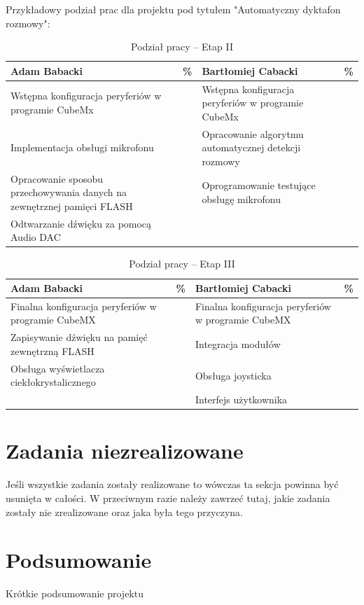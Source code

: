 \documentclass[10pt, a4paper]{article}
\begin{document}
Przykładowy podział prac dla projektu pod tytułem 
"Automatyczny dyktafon rozmowy":

\begin{table}[H]
	\centering
	\begin{tabular}{|L{7cm}|L{0.8cm}||L{7cm}|L{0.8cm}|}
		\hline
		\hline
		\textbf{Adam Babacki} & 
		\% & 
		\textbf{Bartłomiej Cabacki} & \%\\
		\hline
		\hline
		Wstępna konfiguracja peryferiów w programie CubeMx		& &	
		Wstępna konfiguracja peryferiów w programie CubeMx &\\
		\hline
		Implementacja obsługi mikrofonu & &
		Opracowanie algorytmu automatycznej detekcji rozmowy &\\
		\hline
		Opracowanie sposobu przechowywania danych na zewnętrznej pamięci FLASH & &
		Oprogramowanie testujące obsługę mikrofonu & \\
		\hline
		Odtwarzanie dźwięku za pomocą Audio DAC & & &\\
		\hline
	\end{tabular}
	\caption{Podział pracy -- Etap II}
	\label{tab:PodzialPracyEtap2}
\end{table}

\begin{table}[H]
	\centering
	\begin{tabular}{|L{7cm}|L{0.8cm}||L{7cm}|L{0.8cm}|}
		\hline
		\hline
		\textbf{Adam Babacki} & 
		\% & 
		\textbf{Bartłomiej Cabacki} & \%\\
		\hline
		\hline
		Finalna konfiguracja peryferiów w programie CubeMX		& &	
		Finalna konfiguracja peryferiów w programie CubeMX &\\
		\hline
		Zapisywanie dźwięku na pamięć zewnętrzną FLASH  & &
		Integracja modułów &\\
		\hline
		Obsługa wyświetlacza ciekłokrystalicznego & &
		Obsługa joysticka & \\
		\hline
		 & & Interfejs użytkownika &\\
		\hline
	\end{tabular}
	\caption{Podział pracy -- Etap III}
	\label{tab:PodzialPracyEtap3}
\end{table}

\section{Zadania niezrealizowane}

Jeśli wszystkie zadania zostały realizowane to wówczas 
ta sekcja powinna być usunięta w całości. W przeciwnym razie
należy zawrzeć tutaj, jakie zadania zostały nie zrealizowane 
oraz jaka była tego przyczyna.

\section{Podsumowanie}

Krótkie podsumowanie projektu

\newpage
{}


\end{document}
